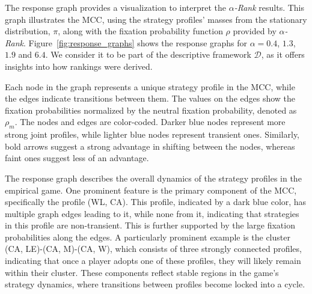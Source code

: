         \noindent
        The response graph provides a visualization to interpret the \emph{$\alpha$-Rank} results. This graph illustrates the MCC, using the strategy profiles' masses from the stationary distribution, $\pi$, along with the fixation probability function $\rho$ provided by \emph{$\alpha$-Rank}. Figure~\ref{fig:response_graphs} shows the response graphs for $\alpha = 0.4$, $1.3$, $1.9$ and $6.4$. We consider it to be part of the descriptive framework $\mathcal{D}$, as it offers insights into how rankings were derived.\tinydouble

        \noindent
        Each node in the graph represents a unique strategy profile in the MCC, while the edges indicate transitions between them. The values on the edges show the fixation probabilities normalized by the neutral fixation probability, denoted as $\rho_m$. The nodes and edges are color-coded. Darker blue nodes represent more strong joint profiles, while lighter blue nodes represent transient ones. Similarly, bold arrows suggest a strong advantage in shifting between the nodes, whereas faint ones suggest less of an advantage.\tinydouble

        \noindent
        The response graph describes the overall dynamics of the strategy profiles in the empirical game. One prominent feature is the primary component of the MCC, specifically the profile (WL, CA). This profile, indicated by a dark blue color, has multiple graph edges leading to it, while none from it, indicating that strategies in this profile are non-transient. This is further supported by the large fixation probabilities along the edges. A particularly prominent example is the cluster (CA, LE)-(CA, M)-(CA, W), which consists of three strongly connected profiles, indicating that once a player adopts one of these profiles, they will likely remain within their cluster. These components reflect stable regions in the game’s strategy dynamics, where transitions between profiles become locked into a cycle.\tinydouble

